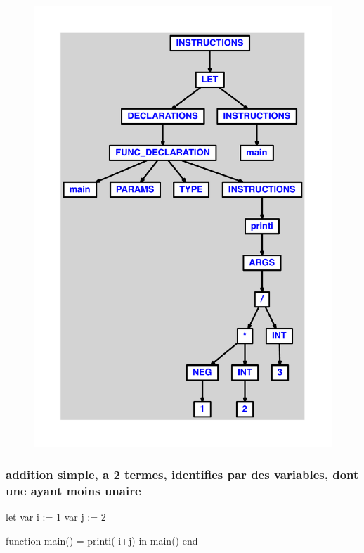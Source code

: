 \documentclass{article}
\begin{document}
\begin{figure}[H]\centering\includegraphics[max width=\textwidth]{ast/ast_74.pdf}\end{figure}\subsubsection{addition simple, a 2 termes, identifies par des variables, dont une ayant moins unaire}
\begin{verbatimtab}
let
	var i := 1
	var j := 2

	function main() = printi(-i+j)
in main() end
\end{verbatimtab}
\end{document}

